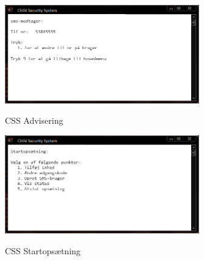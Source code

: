 \begin{figure}[h] \centering
{\includegraphics[width=0.75\textwidth]{billeder/cmdprompt/CSS_advisering}}
\caption{CSS Advisering}
\end{figure}

\begin{figure}[h] \centering
{\includegraphics[width=0.75\textwidth]{billeder/cmdprompt/CSS_startopsaetning}}
\caption{CSS Startopsætning}
\end{figure}


